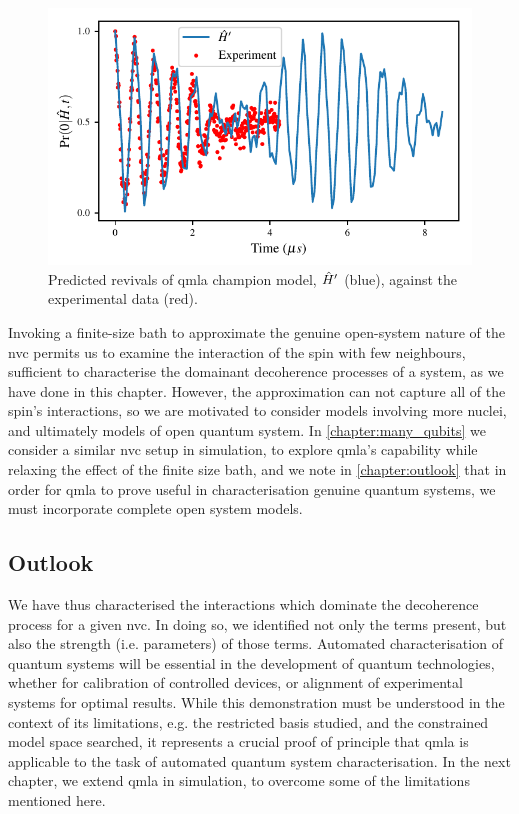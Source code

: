 \begin{figure}
    \begin{center}
        \includegraphics{experimental_study/figures/predicted_revivals.pdf}        
    \end{center}
    \caption[Predicted revivals of QMLA champion model]{
        Predicted revivals of \gls{qmla} \gls{champion model}, $\hat{H}^{\prime}$ (blue), 
        against the experimental data (red). 
    }
    \label{fig:predicted_revivals}
\end{figure}

Invoking a finite-size bath to approximate the genuine open-system nature of the \gls{nvc} 
    permits us to examine the interaction of the spin with few neighbours, 
    sufficient to characterise the domainant decoherence processes of a system, as we have done in this chapter.
However, the approximation can not capture all of the spin's interactions, 
    so we are motivated to consider models involving more nuclei, 
    and ultimately models of open quantum system. 
In \cref{chapter:many_qubits} we consider a similar \gls{nvc} setup in simulation, 
    to explore \gls{qmla}'s capability while relaxing the effect of the finite size bath,
    and we note in \cref{chapter:outlook} that in order for \gls{qmla} to prove useful 
    in characterisation genuine quantum systems, we must incorporate complete open system models. 

\subsection{Outlook}
We have thus characterised the interactions which dominate the decoherence process for a given \gls{nvc}. 
In doing so, we identified not only the terms present, but also the strength (i.e. parameters) of those terms. 
Automated characterisation of quantum systems will be essential in the development of quantum technologies, 
    whether for calibration of controlled devices, or alignment of experimental systems for optimal results. 
While this demonstration must be understood in the context of its limitations, 
    e.g. the restricted basis studied, and the constrained \gls{model space} searched, 
    it represents a crucial proof of principle that \gls{qmla} is applicable to the task 
    of automated quantum system characterisation. 
In the next chapter, we extend \gls{qmla} in simulation, to overcome some of the limitations mentioned here. 
